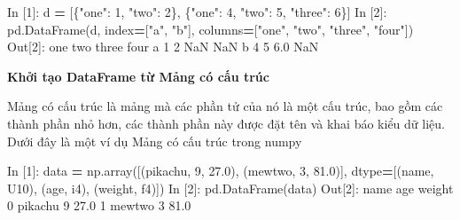 \documentclass[
]{book}
\newenvironment{Shaded}{\begin{snugshade}}{\end{snugshade}}
\newcommand{\DecValTok}[1]{\textcolor[rgb]{0.00,0.00,0.81}{#1}}
\newcommand{\FloatTok}[1]{\textcolor[rgb]{0.00,0.00,0.81}{#1}}
\newcommand{\NormalTok}[1]{#1}
\newcommand{\OperatorTok}[1]{\textcolor[rgb]{0.81,0.36,0.00}{\textbf{#1}}}
\newcommand{\StringTok}[1]{\textcolor[rgb]{0.31,0.60,0.02}{#1}}
\begin{document}
\begin{Shaded}
\begin{Highlighting}[]
\NormalTok{In [}\DecValTok{1}\NormalTok{]: d }\OperatorTok{=}\NormalTok{ [\{}\StringTok{"one"}\NormalTok{: }\DecValTok{1}\NormalTok{, }\StringTok{"two"}\NormalTok{: }\DecValTok{2}\NormalTok{\}, \{}\StringTok{"one"}\NormalTok{: }\DecValTok{4}\NormalTok{, }\StringTok{"two"}\NormalTok{: }\DecValTok{5}\NormalTok{, }\StringTok{"three"}\NormalTok{: }\DecValTok{6}\NormalTok{\}]}
\NormalTok{In [}\DecValTok{2}\NormalTok{]: pd.DataFrame(d, index}\OperatorTok{=}\NormalTok{[}\StringTok{"a"}\NormalTok{, }\StringTok{"b"}\NormalTok{], columns}\OperatorTok{=}\NormalTok{[}\StringTok{"one"}\NormalTok{, }\StringTok{"two"}\NormalTok{, }\StringTok{"three"}\NormalTok{, }\StringTok{"four"}\NormalTok{])}
\NormalTok{Out[}\DecValTok{2}\NormalTok{]:}
\NormalTok{   one  two  three  four}
\NormalTok{a    }\DecValTok{1}    \DecValTok{2}\NormalTok{    NaN   NaN}
\NormalTok{b    }\DecValTok{4}    \DecValTok{5}    \FloatTok{6.0}\NormalTok{   NaN}
\end{Highlighting}
\end{Shaded}

\textbf{Khởi tạo DataFrame từ Mảng có cấu trúc}

Mảng có cấu trúc là mảng mà các phần tử của nó là một cấu trúc, bao gồm các thành phần nhỏ hơn, các thành phần này được đặt tên và khai báo kiểu dữ liệu.
Dưới đây là một ví dụ Mảng có cấu trúc trong numpy

\begin{Shaded}
\begin{Highlighting}[]
\NormalTok{In [}\DecValTok{1}\NormalTok{]: data }\OperatorTok{=}\NormalTok{ np.array([(}\StringTok{\textquotesingle{}pikachu\textquotesingle{}}\NormalTok{, }\DecValTok{9}\NormalTok{, }\FloatTok{27.0}\NormalTok{), (}\StringTok{\textquotesingle{}mewtwo\textquotesingle{}}\NormalTok{, }\DecValTok{3}\NormalTok{, }\FloatTok{81.0}\NormalTok{)],}
\NormalTok{                        dtype}\OperatorTok{=}\NormalTok{[(}\StringTok{\textquotesingle{}name\textquotesingle{}}\NormalTok{, }\StringTok{\textquotesingle{}U10\textquotesingle{}}\NormalTok{), (}\StringTok{\textquotesingle{}age\textquotesingle{}}\NormalTok{, }\StringTok{\textquotesingle{}i4\textquotesingle{}}\NormalTok{), (}\StringTok{\textquotesingle{}weight\textquotesingle{}}\NormalTok{, }\StringTok{\textquotesingle{}f4\textquotesingle{}}\NormalTok{)])}
\NormalTok{In [}\DecValTok{2}\NormalTok{]: pd.DataFrame(data)}
\NormalTok{Out[}\DecValTok{2}\NormalTok{]: }
\NormalTok{       name  age  weight}
\DecValTok{0}\NormalTok{   pikachu    }\DecValTok{9}    \FloatTok{27.0}
\DecValTok{1}\NormalTok{    mewtwo    }\DecValTok{3}    \FloatTok{81.0}
\end{Highlighting}
\end{Shaded}
\end{document}
